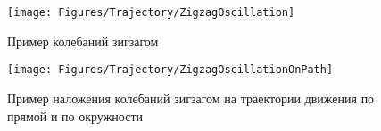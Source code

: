 \begin{figure}[H]
    \centering
    \vspace{14pt}
    \texttt{[image: Figures/Trajectory/ZigzagOscillation]}
    \caption{Пример колебаний зигзагом}
    \label{fig:Trajectory:ZigzagOscillation}
\end{figure}

\begin{figure}[H]
    \centering
    \vspace{14pt}
    \texttt{[image: Figures/Trajectory/ZigzagOscillationOnPath]}
    \caption{Пример наложения колебаний зигзагом на траектории движения по прямой и по окружности}
    \label{fig:Trajectory:ZigzagOscillationOnPath}
\end{figure}
